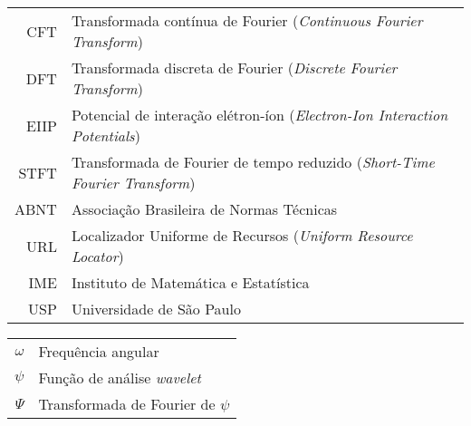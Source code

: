 {
  \raggedbottom



  \begin{tabular}{rl}
    CFT  & Transformada contínua de Fourier (\emph{Continuous Fourier Transform})          \\
    DFT  & Transformada discreta de Fourier (\emph{Discrete Fourier Transform})            \\
    EIIP & Potencial de interação elétron-íon (\emph{Electron-Ion Interaction Potentials}) \\
    STFT & Transformada de Fourier de tempo reduzido (\emph{Short-Time Fourier Transform}) \\
    ABNT & Associação Brasileira de Normas Técnicas                                        \\
    URL  & Localizador Uniforme de Recursos (\emph{Uniform Resource Locator})              \\
    IME  & Instituto de Matemática e Estatística                                           \\
    USP  & Universidade de São Paulo
  \end{tabular}


  \begin{tabular}{rl}
    $\omega$ & Frequência angular                \\
    $\psi$   & Função de análise \emph{wavelet}  \\
    $\Psi$   & Transformada de Fourier de $\psi$ \\
  \end{tabular}

}
